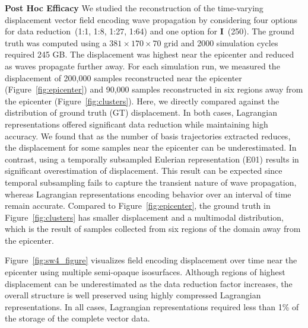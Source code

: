 


\noindent\textbf{Post Hoc Efficacy}
We studied the reconstruction of the time-varying displacement vector field encoding wave propagation by considering four options for data reduction~(1:1, 1:8, 1:27, 1:64) and one option for \textbf{I}~(250).
%
The ground truth was computed using a $381\times170\times70$ grid and 2000 simulation cycles required 245 GB.
%
The displacement was highest near the epicenter and reduced as waves propagate further away.
%
For each simulation run, we measured the displacement of 200,000 samples reconstructed near the epicenter (Figure~\ref{fig:epicenter}) and 90,000 samples reconstructed in six regions away from the epicenter (Figure~\ref{fig:clusters}).
%
Here, we directly compared against the distribution of ground truth (GT) displacement.
%
In both cases, Lagrangian representations offered significant data reduction while maintaining high accuracy.
%
We found that as the number of basis trajectories extracted reduces, the displacement for some samples near the epicenter can be underestimated. 
%
In contrast, using a temporally subsampled Eulerian representation (E01) results in significant overestimation of displacement.
%
This result can be expected since temporal subsampling fails to capture the transient nature of wave propagation, whereas Lagrangian representations encoding behavior over an interval of time remain accurate.
%
Compared to Figure~\ref{fig:epicenter}, the ground truth in Figure~\ref{fig:clusters} has smaller displacement and a multimodal distribution, which is the result of samples collected from six regions of the domain away from the epicenter. 
%

Figure~\ref{fig:sw4_figure} visualizes field encoding displacement over time near the epicenter using multiple semi-opaque isosurfaces.
%
Although regions of highest displacement can be underestimated as the data reduction factor increases, the overall structure is well preserved using highly compressed Lagrangian representations.
%
In all cases, Lagrangian representations required less than 1\% of the storage of the complete vector data.
